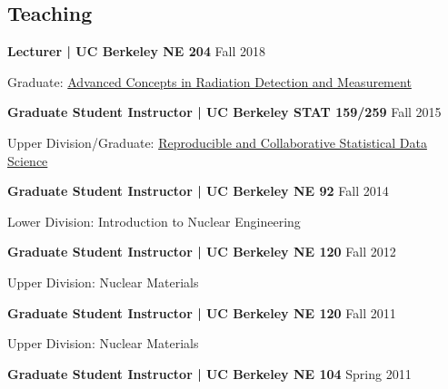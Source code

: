 \documentclass[margin,line]{res}
\newenvironment{list1}{
  \begin{list}{\ding{113}}{%
      \setlength{\itemsep}{0in}
      \setlength{\parsep}{0in} \setlength{\parskip}{0in}
      \setlength{\topsep}{0in} \setlength{\partopsep}{0in} 
      \setlength{\leftmargin}{0.17in}}}{\end{list}}
\begin{document}
\begin{resume}
\section{\sc Teaching\footnotemark}

{\bf Lecturer | UC Berkeley NE 204} \hfill Fall 2018

\begin{list1}
\item[] Graduate: 
        \href{http://ne204-fall2018.github.io}
             {Advanced Concepts in Radiation Detection and Measurement}
\end{list1}

{\bf Graduate Student Instructor | UC Berkeley STAT 159/259} \hfill Fall 2015 

\begin{list1}
\item[] Upper Division\footnotemark/Graduate: 
        \href{http://www.jarrodmillman.com/stat159-fall2015/}
             {Reproducible and Collaborative Statistical Data Science}
\end{list1}
{\bf Graduate Student Instructor | UC Berkeley NE 92} \hfill Fall 2014

\begin{list1}
  \item[] Lower Division: Introduction to Nuclear Engineering
\end{list1}
{\bf Graduate Student Instructor | UC Berkeley NE 120} \hfill Fall 2012

\begin{list1}
  \item[] Upper Division: Nuclear Materials
\end{list1}
{\bf Graduate Student Instructor | UC Berkeley NE 120} \hfill Fall 2011

\begin{list1}
  \item[] Upper Division: Nuclear Materials
\end{list1}
{\bf Graduate Student Instructor | UC Berkeley NE 104} \hfill Spring 2011


\end{resume}
\end{document}
